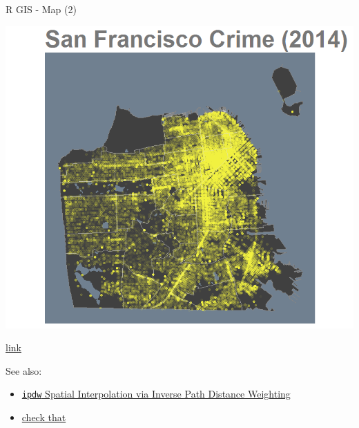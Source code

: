 \documentclass[8pt,ignorenonframetext,]{beamer}
\providecommand{\tightlist}{%
  \setlength{\itemsep}{0pt}\setlength{\parskip}{0pt}}
\begin{document}
\begin{frame}[fragile]{R GIS - Map (2)}

\includegraphics{imgPres/map_SF_Crime2014.png}

\href{http://sharpsightlabs.com/blog/mapping-san-francisco-crime/}{link}

See also:

\begin{itemize}
\tightlist
\item
  \href{https://cran.r-project.org/web/packages/ipdw/vignettes/ipdw2.html}{\texttt{ipdw}
  Spatial Interpolation via Inverse Path Distance Weighting}
\item
  \href{https://mgimond.github.io/Spatial/interpolation-in-r.html}{check
  that}
\end{itemize}

\end{frame}
\end{document}
